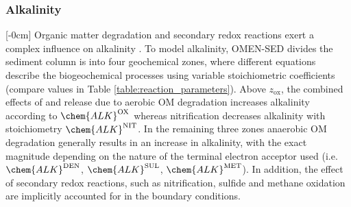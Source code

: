 \documentclass[gmd, manuscript]{copernicus}
\begin{document}
\subsubsection{Alkalinity}\label{subsubsec:ALK}
[-0cm]%
Organic matter degradation and secondary redox reactions exert a complex influence on alkalinity  \citep[e.g.][]{jourabchi_quantitative_2005, wolf-gladrow_total_2007, krumins_dissolved_2013}. 
To model alkalinity, OMEN-SED divides the sediment column is into four geochemical zones, 
where different equations describe the biogeochemical processes using variable stoichiometric coefficients (compare values in Table \ref{table:reaction_parameters}). 
Above $z_{\mathrm{ox}}$, the combined effects of  and  release due to aerobic OM degradation increases alkalinity according to $\chem{ALK}^\mathrm{OX}$ whereas nitrification decreases alkalinity with stoichiometry 
$\chem{ALK}^\mathrm{NIT}$. 
In the remaining three zones anaerobic OM degradation generally results in an increase in alkalinity, with the exact magnitude depending on the nature of the terminal electron acceptor used 
(i.e. $\chem{ALK}^\mathrm{DEN}$, $\chem{ALK}^\mathrm{SUL}$, $\chem{ALK}^\mathrm{MET}$). In addition, the effect of secondary redox reactions, such as nitrification, sulfide and methane oxidation are implicitly accounted for in the 
boundary conditions. 
\end{document}
